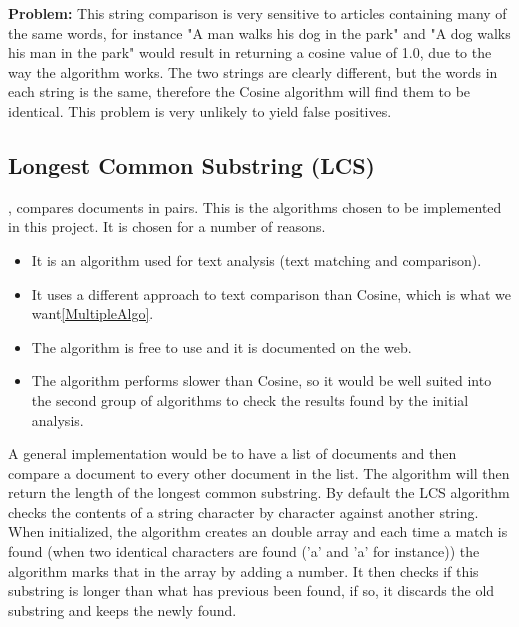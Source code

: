 \textbf{Problem:} \label{CosineProblem} This string comparison is very sensitive to articles containing many of the same words, for instance "A man walks his dog in the park" and "A dog walks his man in the park" would result in returning a cosine value of 1.0, due to the way the algorithm works. The two strings are clearly different, but the words in each string is the same, therefore the Cosine algorithm will find them to be identical. This problem is very unlikely to yield false positives.

\subsection{Longest Common Substring (LCS)}, compares documents in pairs. This is the algorithms chosen to be implemented in this project. It is chosen for a number of reasons. 

\begin{itemize}
	\item It is an algorithm used for text analysis (text matching and comparison).
	\item It uses a different approach to text comparison than Cosine, which is what we want\ref{MultipleAlgo}.
	\item The algorithm is free to use and it is documented on the web.
	\item The algorithm performs slower than Cosine, so it would be well suited into the second group of algorithms to check the results found by the initial analysis.
\end{itemize}

 A general implementation would be to have a list of documents and then compare a document to every other document in the list. The algorithm will then return the length of the longest common substring. By default the LCS algorithm\cite{WikiLCS} checks the contents of a string character by character against another string. When initialized, the algorithm creates an double array and each time a match is found (when two identical characters are found ('a' and 'a' for instance)) the algorithm marks that in the array by adding a number. It then checks if this substring is longer than what has previous been found, if so, it discards the old substring and keeps the newly found.

